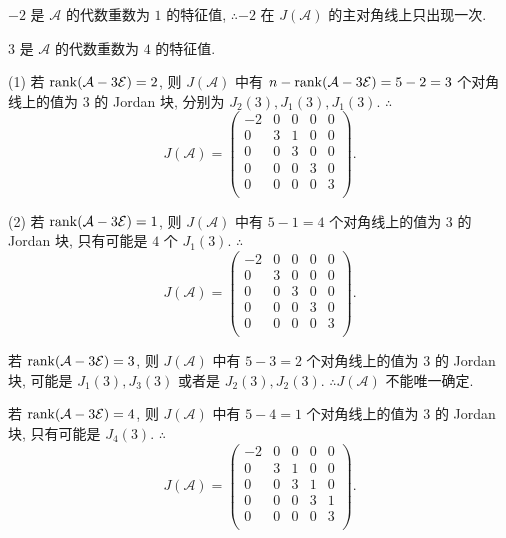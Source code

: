 \documentclass[color=black,device=normal,lang=cn,mode=geye]{elegantnote}
\begin{document}
\begin{solution}
    $-2$ 是 $\mathcal{A}$ 的代数重数为 $1$ 的特征值, $\therefore-2$ 在 $J(\mathcal{A})$ 的主对角线上只出现一次.

    $3$ 是 $\mathcal{A}$ 的代数重数为 $4$ 的特征值.

    (1) 若 $\operatorname{rank} (\mathcal{A}-3\mathcal{E})=2$, 则 $J(\mathcal{A})$ 中有 $n-\operatorname{rank} (\mathcal{A}-3\mathcal{E})=5-2=3$ 个对角线上的值为 $3$ 的 Jordan 块, 分别为 $J_2(3),J_1(3),J_1(3)$. $\therefore$
    \[J(\mathcal{A})=\begin{pmatrix}
        -2 & 0 & 0 & 0 & 0 \\
        0 & 3 & 1 & 0 & 0 \\
        0 & 0 & 3 & 0 & 0 \\
        0 & 0 & 0 & 3 & 0 \\
        0 & 0 & 0 & 0 & 3 \\
    \end{pmatrix}.\]

    (2) 若 $\operatorname{rank} (\mathcal{A}-3\mathcal{E})=1$, 则 $J(\mathcal{A})$ 中有 $5-1=4$ 个对角线上的值为 $3$ 的 Jordan 块, 只有可能是 $4$ 个 $J_1(3)$. $\therefore$
    \[J(\mathcal{A})=\begin{pmatrix}
        -2 & 0 & 0 & 0 & 0 \\
        0 & 3 & 0 & 0 & 0 \\
        0 & 0 & 3 & 0 & 0 \\
        0 & 0 & 0 & 3 & 0 \\
        0 & 0 & 0 & 0 & 3 \\
    \end{pmatrix}.\]

    若 $\operatorname{rank} (\mathcal{A}-3\mathcal{E})=3$, 则 $J(\mathcal{A})$ 中有 $5-3=2$ 个对角线上的值为 $3$ 的 Jordan 块, 可能是 $J_1(3),J_3(3)$ 或者是 $J_2(3),J_2(3)$. $\therefore J(\mathcal{A})$ 不能唯一确定.

    若 $\operatorname{rank} (\mathcal{A}-3\mathcal{E})=4$, 则 $J(\mathcal{A})$ 中有 $5-4=1$ 个对角线上的值为 $3$ 的 Jordan 块, 只有可能是 $J_4(3)$. $\therefore$
    \[J(\mathcal{A})=\begin{pmatrix}
        -2 & 0 & 0 & 0 & 0 \\
        0 & 3 & 1 & 0 & 0 \\
        0 & 0 & 3 & 1 & 0 \\
        0 & 0 & 0 & 3 & 1 \\
        0 & 0 & 0 & 0 & 3 \\
    \end{pmatrix}.\]
\end{solution}
\end{document}

